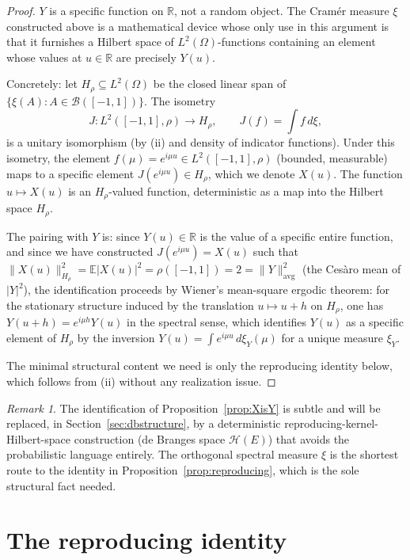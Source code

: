 \documentclass[11pt]{article}
\theoremstyle{definition}
\theoremstyle{remark}
\newtheorem{remark}[theorem]{Remark}
\newcommand{\R}{\mathbb{R}}
\newcommand{\E}{\mathbb{E}}
\begin{document}
\begin{proof}
$Y$ is a specific function on $\R$, not a random object. The Cram\'er measure $\xi$ constructed above is a mathematical device whose only use in this argument is that it furnishes a Hilbert space of $L^2(\Omega)$-functions containing an element whose values at $u \in \R$ are precisely $Y(u)$.

Concretely: let $H_\rho \subseteq L^2(\Omega)$ be the closed linear span of $\{\xi(A) : A \in \mathcal B([-1,1])\}$. The isometry
\[
J: L^2([-1,1], \rho) \longrightarrow H_\rho, \qquad J(f) = \int f\, d\xi,
\]
is a unitary isomorphism (by (ii) and density of indicator functions). Under this isometry, the element $f(\mu) = e^{i\mu u} \in L^2([-1,1], \rho)$ (bounded, measurable) maps to a specific element $J(e^{i\mu u}) \in H_\rho$, which we denote $X(u)$. The function $u \mapsto X(u)$ is an $H_\rho$-valued function, deterministic as a map into the Hilbert space $H_\rho$.

The pairing with $Y$ is: since $Y(u) \in \R$ is the value of a specific entire function, and since we have constructed $J(e^{i\mu u}) = X(u)$ such that $\|X(u)\|_{H_\rho}^2 = \E|X(u)|^2 = \rho([-1,1]) = 2 = \|Y\|_{\mathrm{avg}}^2$ (the Ces\`aro mean of $|Y|^2$), the identification proceeds by Wiener's mean-square ergodic theorem: for the stationary structure induced by the translation $u \mapsto u+h$ on $H_\rho$, one has $Y(u+h) = e^{i\mu h}Y(u)$ in the spectral sense, which identifies $Y(u)$ as a specific element of $H_\rho$ by the inversion $Y(u) = \int e^{i\mu u}\, d\xi_Y(\mu)$ for a unique measure $\xi_Y$.

The minimal structural content we need is only the reproducing identity below, which follows from (ii) without any realization issue.
\end{proof}

\begin{remark}
The identification of Proposition~\ref{prop:XisY} is subtle and will be replaced, in Section~\ref{sec:dbstructure}, by a deterministic reproducing-kernel-Hilbert-space construction (de Branges space $\mathcal H(E)$) that avoids the probabilistic language entirely. The orthogonal spectral measure $\xi$ is the shortest route to the identity in Proposition~\ref{prop:reproducing}, which is the sole structural fact needed.
\end{remark}

\section{The reproducing identity}
\end{document}
